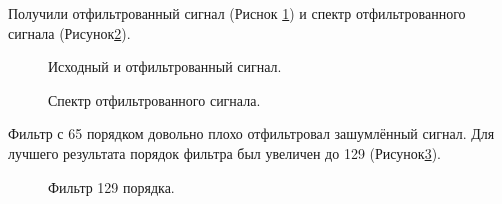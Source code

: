 \documentclass[a4paper,14pt]{extarticle}
\begin{document}
Получили отфильтрованный сигнал (Риснок \ref{005}) и спектр отфильтрованного сигнала (Рисунок\ref{006}).

\begin{figure}[H]
\caption{Исходный и отфильтрованный сигнал.}
\label{005}
\end{figure}

\begin{figure}[H]
\caption{Спектр отфильтрованного сигнала.}
\label{006}
\end{figure}

Фильтр с 65 порядком довольно плохо отфильтровал зашумлённый сигнал. Для лучшего результата порядок фильтра был увеличен до 129 (Рисунок\ref{007}).

\begin{figure}[H]
\caption{Фильтр 129 порядка.}
\label{007}
\end{figure}
\end{document}
